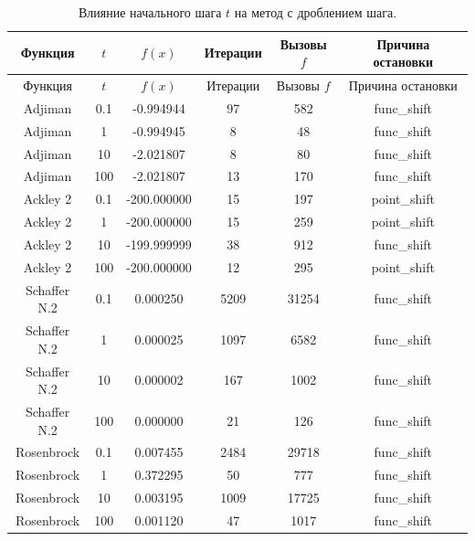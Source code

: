 \begin{longtable}{|c|c|c|c|c|c|}
\caption{Влияние начального шага $t$ на метод с дроблением шага.}\label{tab:grad_tuning}\\
\hline
Функция & $t$ & $f(x)$ & Итерации & Вызовы $f$ & Причина остановки \\
\hline
\endfirsthead
\hline
Функция & $t$ & $f(x)$ & Итерации & Вызовы $f$ & Причина остановки \\
\hline
\endhead
Adjiman & 0.1 & -0.994944 & 97 & 582 & func\_shift \\
Adjiman & 1 & -0.994945 & 8 & 48 & func\_shift \\
Adjiman & 10 & -2.021807 & 8 & 80 & func\_shift \\
Adjiman & 100 & -2.021807 & 13 & 170 & func\_shift \\
Ackley 2 & 0.1 & -200.000000 & 15 & 197 & point\_shift \\
Ackley 2 & 1 & -200.000000 & 15 & 259 & point\_shift \\
Ackley 2 & 10 & -199.999999 & 38 & 912 & func\_shift \\
Ackley 2 & 100 & -200.000000 & 12 & 295 & point\_shift \\
Schaffer N.2 & 0.1 & 0.000250 & 5209 & 31254 & func\_shift \\
Schaffer N.2 & 1 & 0.000025 & 1097 & 6582 & func\_shift \\
Schaffer N.2 & 10 & 0.000002 & 167 & 1002 & func\_shift \\
Schaffer N.2 & 100 & 0.000000 & 21 & 126 & func\_shift \\
Rosenbrock & 0.1 & 0.007455 & 2484 & 29718 & func\_shift \\
Rosenbrock & 1 & 0.372295 & 50 & 777 & func\_shift \\
Rosenbrock & 10 & 0.003195 & 1009 & 17725 & func\_shift \\
Rosenbrock & 100 & 0.001120 & 47 & 1017 & func\_shift \\
\hline
\end{longtable}
